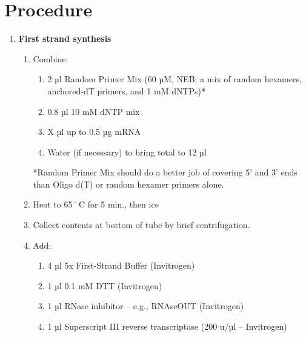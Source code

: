 \documentclass[
  letterpaper,
  DIV=11,
  numbers=noendperiod]{scrreprt}
\providecommand{\tightlist}{%
  \setlength{\itemsep}{0pt}\setlength{\parskip}{0pt}}\usepackage{longtable,booktabs,array}
\begin{document}
\hypertarget{procedure-12}{%
\section{Procedure}\label{procedure-12}}

\begin{enumerate}
\def\labelenumi{\arabic{enumi}.}
\item
  \textbf{First strand synthesis}

  \begin{enumerate}
  \def\labelenumii{\arabic{enumii}.}
  \item
    Combine:

    \begin{enumerate}
    \def\labelenumiii{\arabic{enumiii}.}
    \tightlist
    \item
      2 µl Random Primer Mix (60 µM, NEB; a mix of random hexamers,
      anchored-dT primers, and 1 mM dNTPs)*
    \item
      0.8 µl 10 mM dNTP mix
    \item
      X µl up to 0.5 µg mRNA
    \item
      Water (if necessary) to bring total to 12 µl
    \end{enumerate}

    \begin{tcolorbox}[enhanced jigsaw, toprule=.15mm, breakable, coltitle=black, leftrule=.75mm, title=\textcolor{quarto-callout-important-color}{\faExclamation}\hspace{0.5em}{NOTE}, bottomrule=.15mm, toptitle=1mm, bottomtitle=1mm, colframe=quarto-callout-important-color-frame, opacityback=0, colback=white, opacitybacktitle=0.6, colbacktitle=quarto-callout-important-color!10!white, rightrule=.15mm, titlerule=0mm, arc=.35mm, left=2mm]

    *Random Primer Mix should do a better job of covering 5' and 3' ends
    than Oligo d(T) or random hexamer primers alone.

    \end{tcolorbox}
  \item
    Heat to 65˚C for 5 min., then ice
  \item
    Collect contents at bottom of tube by brief centrifugation.
  \item
    Add:

    \begin{enumerate}
    \def\labelenumiii{\arabic{enumiii}.}
    \tightlist
    \item
      4 µl 5x First-Strand Buffer (Invitrogen)
    \item
      1 µl 0.1 mM DTT (Invitrogen)
    \item
      1 µl RNase inhibitor -- e.g., RNAseOUT (Invitrogen)
    \item
      1 µl Superscript III reverse transcriptase (200 u/µl --
      Invitrogen)
    \end{enumerate}


\end{enumerate}
\end{enumerate}
\end{document}
